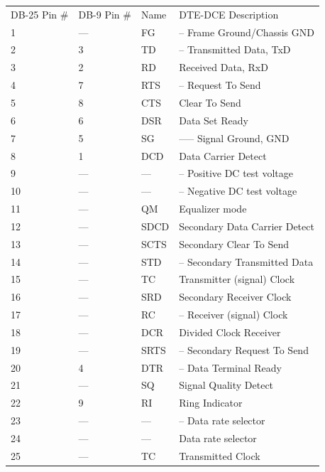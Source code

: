 {{{{{{{{{{\begin{longtable}{llll}
{DB-25 Pin \#} & {DB-9 Pin \#} & {Name} & {DTE-DCE Description 
 } \\
{1} & {{---}} & {FG} & {{--} Frame Ground/Chassis GND 
 } \\
{2} & {3} & {TD} & {{--}\gt{} Transmitted Data, TxD 
 } \\
{3} & {2} & {RD} & {\lt{}{--} Received Data, RxD 
 } \\
{4} & {7} & {RTS} & {{--}\gt{} Request To Send 
 } \\
{5} & {8} & {CTS} & {\lt{}{--} Clear To Send 
 } \\
{6} & {6} & {DSR} & {\lt{}{--} Data Set Ready 
 } \\
{7} & {5} & {SG} & {{--}{---} Signal Ground, GND 
 } \\
{8} & {1} & {DCD} & {\lt{}{--} Data Carrier Detect 
 } \\
{9} & {{---}} & {{---}} & {{--} Positive DC test voltage 
 } \\
{10} & {{---}} & {{---}} & {{--} Negative DC test voltage 
 } \\
{11} & {{---}} & {QM} & {\lt{}{--} Equalizer mode 
 } \\
{12} & {{---}} & {SDCD} & {\lt{}{--} Secondary Data Carrier Detect 
 } \\
{13} & {{---}} & {SCTS} & {\lt{}{--} Secondary Clear To Send 
 } \\
{14} & {{---}} & {STD} & {{--}\gt{} Secondary Transmitted Data 
 } \\
{15} & {{---}} & {TC} & {\lt{}{--} Transmitter (signal) Clock 
 } \\
{16} & {{---}} & {SRD} & {\lt{}{--} Secondary Receiver Clock 
 } \\
{17} & {{---}} & {RC} & {{--}\gt{} Receiver (signal) Clock 
 } \\
{18} & {{---}} & {DCR} & {\lt{}{--} Divided Clock Receiver 
 } \\
{19} & {{---}} & {SRTS} & {{--}\gt{} Secondary Request To Send 
 } \\
{20} & {4} & {DTR} & {{--}\gt{} Data Terminal Ready 
 } \\
{21} & {{---}} & {SQ} & {\lt{}{--} Signal Quality Detect 
 } \\
{22} & {9} & {RI} & {\lt{}{--} Ring Indicator 
 } \\
{23} & {{---}} & {{---}} & {{--}\gt{} Data rate selector 
 } \\
{24} & {{---}} & {{---}} & {\lt{}{--} Data rate selector 
 } \\
{25} & {{---}} & {TC} & {\lt{}{--} Transmitted Clock  
}


\end{longtable}}}}}}}}}}}

